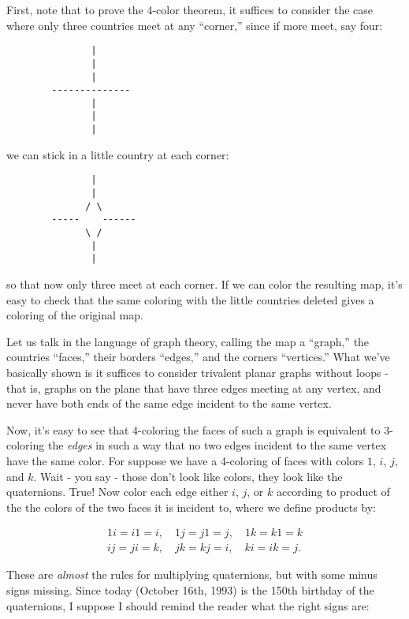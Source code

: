 \documentclass{article}
\begin{document}
First, note that to prove the 4-color theorem, it suffices to consider
the case where only three countries meet at any ``corner,'' since if
more meet, say four:

\begin{verbatim}
               |
               |
               |
        --------------
               |
               |
               |
\end{verbatim}

we can stick in a little country at each corner:

\begin{verbatim}
               |
               |
              / \
        -----    ------
              \ /
               |
               |
\end{verbatim}

so that now only three meet at each corner. If we can color the
resulting map, it's easy to check that the same coloring with the little
countries deleted gives a coloring of the original map.

Let us talk in the language of graph theory, calling the map a
``graph,'' the countries ``faces,'' their borders ``edges,'' and the
corners ``vertices.'' What we've basically shown is it suffices to
consider trivalent planar graphs without loops - that is, graphs on the
plane that have three edges meeting at any vertex, and never have both
ends of the same edge incident to the same vertex.

Now, it's easy to see that 4-coloring the faces of such a graph is
equivalent to 3-coloring the \emph{edges} in such a way that no two
edges incident to the same vertex have the same color. For suppose we
have a 4-coloring of faces with colors \(1\), \(i\), \(j\), and \(k\).
Wait - you say - those don't look like colors, they look like the
quaternions. True! Now color each edge either \(i\), \(j\), or \(k\)
according to product of the the colors of the two faces it is incident
to, where we define products by:

\[\begin{gathered}1i = i1 = i, \quad 1j = j1 = j, \quad 1k = k1 = k \\ ij = ji = k, \quad jk = kj = i, \quad ki = ik = j.\end{gathered}\]

These are \emph{almost} the rules for multiplying quaternions, but with
some minus signs missing. Since today (October 16th, 1993) is the 150th
birthday of the quaternions, I suppose I should remind the reader what
the right signs are:
\end{document}

